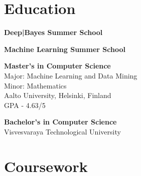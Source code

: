 \documentclass[]{deedy-resume}
\begin{document}
%
%
\lastupdated

%
%

%
%

\begin{minipage}[t]{0.35\textwidth} 


\section{Education} 

\textbullet{} \textbf{Deep|Bayes Summer School}\\ 

\textbullet{} \textbf{Machine Learning Summer School}\\ 
\sectionsep

\textbullet{} \textbf{Master's in Computer Science}\\
Major: Machine Learning and Data Mining\\
Minor: Mathematics\\
Aalto University, Helsinki, Finland\\
GPA - 4.63/5\\
\sectionsep

\textbullet{} \textbf{Bachelor's in Computer Science}\\
Visvesvaraya Technological University\\



\section{Coursework}

\end{minipage}
\end{document}
